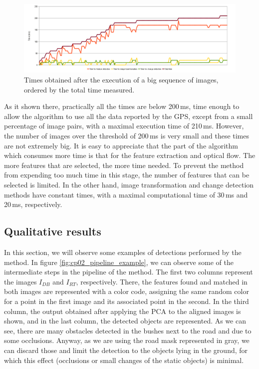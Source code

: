 \begin{figure}[h!]
\centering
\includegraphics[width=\textwidth]{times}
\caption{Times obtained after the execution of a big sequence of images, ordered by the total time measured.}\label{fig:cp02_times}
\end{figure}

As it shown there, practically all the times are below 200\,ms, time enough to allow the algorithm to use all the data reported by the \ac{GPS}, except from a small percentage of image pairs, with a maximal execution time of 210\,ms. However, the number of images over the threshold of 200\,ms is very small and these times are not extremely big. It is easy to appreciate that the part of the algorithm which consumes more time is that for the feature extraction and optical flow. The more features that are selected, the more time needed. To prevent the method from expending too much time in this stage, the number of features that can be selected is limited. In the other hand, image transformation and change detection methods have constant times, with a maximal computational time of 30\,ms and 20\,ms, respectively.

\subsection{Qualitative results}\label{ch:chapter02_02_04}

In this section, we will observe some examples of detections performed by the method. In figure \ref{fig:cp02_pipeline_example}, we can observe some of the intermediate steps in the pipeline of the method. The first two columns represent the images $I_{DB}$ and $I_{RT}$, respectively. There, the features found and matched in both images are represented with a color code, assigning the same random color for a point in the first image and its associated point in the second. In the third column, the output obtained after applying the \ac{PCA} to the aligned images is shown, and in the last column, the detected objects are represented. As we can see, there are many obstacles detected in the bushes next to the road and due to some occlusions. Anyway, as we are using the road mask represented in gray, we can discard those and limit the detection to the objects lying in the ground, for which this effect (occlusions or small changes of the static objects) is minimal.

